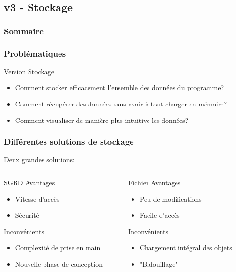 \documentclass{beamer}
\begin{document}
        \subsection{v3 - Stockage}
            \begin{frame}
                \frametitle{Sommaire}
            \end{frame}
        \begin{frame}
        \frametitle{Problématiques}
        Version Stockage
        \pause
        \begin{itemize}
        \item Comment stocker efficacement l'ensemble des données du programme?
        \pause
        \item Comment récupérer des données sans avoir à tout charger en mémoire?
        \pause
        \item Comment visualiser de manière plus intuitive les données?
        \end{itemize}
        \end{frame}
        \begin{frame}
        \frametitle{Différentes solutions de stockage}
        Deux grandes solutions:
        \pause
        \begin{columns}[t]
        \begin{column}{4cm}
        \begin{block}{SGBD}
        \pause
        Avantages
        \begin{itemize}
        \pause
        \item Vitesse d'accès
        \pause
        \item Sécurité
        \end{itemize}
        \pause
        Inconvénients
        \begin{itemize}
        \pause
        \item Complexité de prise en main
        \pause
        \item Nouvelle phase de conception
        \end{itemize}
        \end{block}
        \end{column}
        \pause
        \begin{column}{4cm}
        \begin{block}{Fichier}
        \pause
        Avantages
        \begin{itemize}
        \pause
        \item Peu de modifications
        \pause
        \item Facile d'accès
        \end{itemize}
        \pause
        Inconvénients
        \begin{itemize}
        \pause
        \item Chargement intégral des objets
        \pause
        \item "Bidouillage"
        \end{itemize}
        \end{block}
        \end{column}
        \end{columns}
        \end{frame}
\end{document}
